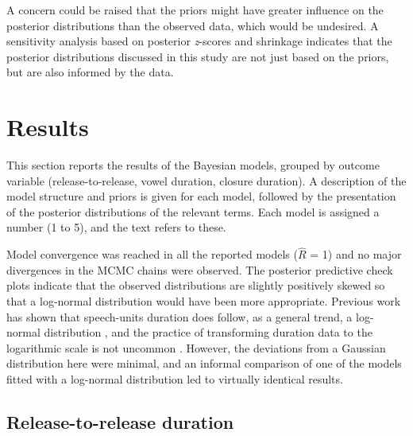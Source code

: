 \documentclass[12pt,a4paper,]{article}
\begin{document}
A concern could be raised that the priors might have greater influence
on the posterior distributions than the observed data, which would be
undesired. A sensitivity analysis based on posterior \emph{z}-scores and
shrinkage \citep{betancourt2018} indicates that the posterior
distributions discussed in this study are not just based on the priors,
but are also informed by the data.

\hypertarget{results}{%
\section{Results}\label{results}}

This section reports the results of the Bayesian models, grouped by
outcome variable (release-to-release, vowel duration, closure duration).
A description of the model structure and priors is given for each model,
followed by the presentation of the posterior distributions of the
relevant terms. Each model is assigned a number (1 to 5), and the text
refers to these.

Model convergence was reached in all the reported models (\(\hat{R}\) =
1) and no major divergences in the MCMC chains were observed. The
posterior predictive check plots indicate that the observed
distributions are slightly positively skewed so that a log-normal
distribution would have been more appropriate. Previous work has shown
that speech-units duration does follow, as a general trend, a log-normal
distribution \citep{rosen2005, ratnikova2017}, and the practice of
transforming duration data to the logarithmic scale is not uncommon
\citep{gahl2019}. However, the deviations from a Gaussian distribution
here were minimal, and an informal comparison of one of the models
fitted with a log-normal distribution led to virtually identical
results.

\hypertarget{release-to-release-duration}{%
\subsection{Release-to-release
duration}\label{release-to-release-duration}}

\label{s:rr}
\end{document}
